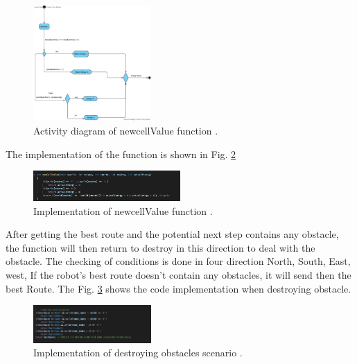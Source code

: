 \documentclass[conference]{IEEEtran}
\begin{document}
\begin{figure}[!h]
	
	\centering
	\includegraphics[width=0.4\textwidth]{NextStep.png}
	\caption{\label{nextstepAct}Activity diagram of newcellValue function .}
	
\end{figure}



The implementation of the function is shown in Fig. \ref{calCode}


\begin{figure}[!h]
	
	\centering
	\includegraphics[width=0.5\textwidth]{newCalCode.png}
	\caption{\label{calCode} Implementation of newcellValue function .}
	
\end{figure}


After getting the best route and the potential next step contains any obstacle, the function  will then return to destroy in this direction to deal with the obstacle. The checking of conditions is done in four direction North, South, East, west, If the robot's best route doesn't contain any obstacles, it will send then the best Route. The Fig. \ref{obstCode} shows the code implementation when destroying obstacle. 

\begin{figure}[!h]
	
	\centering
	\includegraphics[width=0.4\textwidth]{oBSTECLEScODE.png}
	\caption{\label{obstCode} Implementation of destroying obstacles scenario  .}
	
\end{figure}
\end{document}
